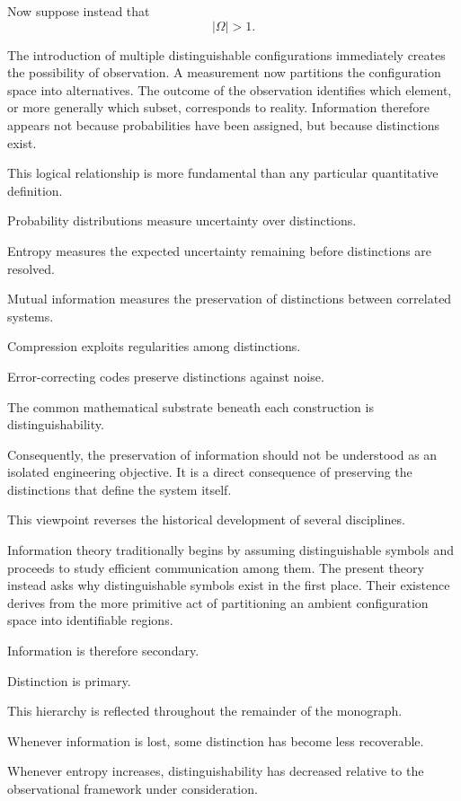 \documentclass[11pt]{book}
\numberwithin{equation}{chapter}
\theoremstyle{definition}
\theoremstyle{plain}
\begin{document}
Now suppose instead that
\[
|\Omega|>1.
\]

The introduction of multiple distinguishable configurations immediately creates the possibility of observation. A measurement now partitions the configuration space into alternatives. The outcome of the observation identifies which element, or more generally which subset, corresponds to reality. Information therefore appears not because probabilities have been assigned, but because distinctions exist.

This logical relationship is more fundamental than any particular quantitative definition.

Probability distributions measure uncertainty over distinctions.

Entropy measures the expected uncertainty remaining before distinctions are resolved.

Mutual information measures the preservation of distinctions between correlated systems.

Compression exploits regularities among distinctions.

Error-correcting codes preserve distinctions against noise.

The common mathematical substrate beneath each construction is distinguishability.

Consequently, the preservation of information should not be understood as an isolated engineering objective. It is a direct consequence of preserving the distinctions that define the system itself.

This viewpoint reverses the historical development of several disciplines.

Information theory traditionally begins by assuming distinguishable symbols and proceeds to study efficient communication among them. The present theory instead asks why distinguishable symbols exist in the first place. Their existence derives from the more primitive act of partitioning an ambient configuration space into identifiable regions.

Information is therefore secondary.

Distinction is primary.

This hierarchy is reflected throughout the remainder of the monograph.

Whenever information is lost, some distinction has become less recoverable.

Whenever entropy increases, distinguishability has decreased relative to the observational framework under consideration.
\end{document}

